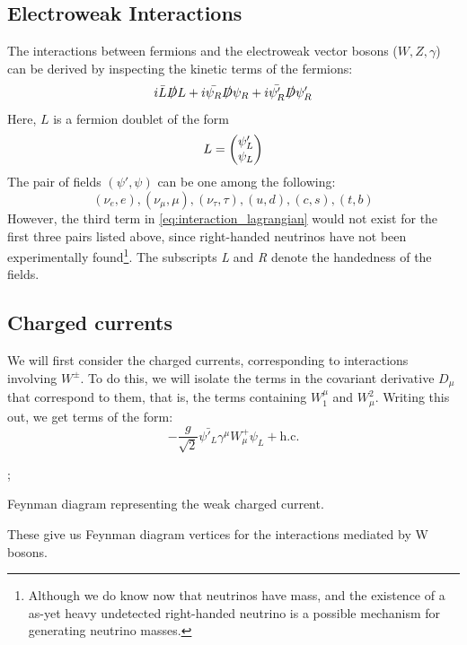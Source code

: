 \subsection{Electroweak Interactions}

The interactions between fermions and the electroweak vector bosons ($W,Z,\gamma$) can be derived by inspecting the kinetic terms of the fermions:
\begin{equation}
  i\bar{L}\slashed{D}L + i\bar{\psi_R}\slashed{D}\psi_R + i\bar{\psi'_R}\slashed{D}\psi'_R
\label{eq:interaction_lagrangian}
\end{equation}
Here, $L$ is a fermion doublet of the form
$$L = \begin{pmatrix} \psi'_L \\ \psi_L\end{pmatrix}$$
The pair of fields $(\psi', \psi)$ can be one among the following: 
$$(\nu_e,e), (\nu_\mu,\mu), (\nu_\tau, \tau), (u, d), (c, s), (t, b)$$
However, the third term in \eqref{eq:interaction_lagrangian} would not exist for the first three pairs listed above, since right-handed neutrinos have not been experimentally found\footnote{Although we do know now that neutrinos have mass, and the existence of a as-yet heavy undetected right-handed neutrino is a possible mechanism for generating neutrino masses.}. The subscripts \emph{L} and \emph{R} denote the handedness of the fields.
\subsection{Charged currents}
We will first consider the charged currents, corresponding to interactions involving $W^\pm$. To do this, we will isolate the terms in the covariant derivative $D_\mu$ that correspond to them, that is, the terms containing $W_1^\mu$ and $W_\mu^2$. Writing this out, we get terms of the form:
\begin{equation*}
  -\frac{g}{\sqrt{2}}\bar{\psi'_L}\gamma^\mu W_\mu^+\psi_L + \text{h.c}.
\end{equation*}
\begin{marginfigure}
;
\caption{Feynman diagram representing the weak charged current.}
\end{marginfigure}
These give us Feynman diagram vertices for the interactions mediated by W bosons.
